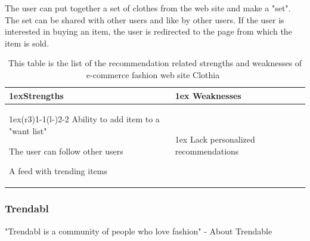     The user can put together a set of clothes from the web site and make a "set".
    The set can be shared with other users and like by other users.
    If the user is interested in buying an item, the user is redirected to the page from which the item is sold.
    \begin{table}[H]
                \centering
                \begin{tabularx}{\linewidth}{>{\parskip1ex}X@{\kern4\tabcolsep}>{\parskip1ex}X}
                \toprule
                \hfil\bfseries Strengths
                &
                \hfil\bfseries Weaknesses
                \\\cmidrule(r{3\tabcolsep}){1-1}\cmidrule(l{-\tabcolsep}){2-2}
                Ability to add item to a "want list" \par
                The user can follow other users \par
                A feed with trending items \par
            	&
                Lack personalized recommendations \par
                \\ \bottomrule
        \end{tabularx}
        \caption[Recommendation related strengths and weaknesses of Clothia~\cite{clothia}]{This table is the list of the recommendation related strengths and weaknesses of e-commerce fashion web site Clothia~\cite{clothia}}
        \label{table:ecommenreceClothia}
    \end{table}


\subsubsection{Trendabl} %
\label{par:trendabl}
    "Trendabl is a community of people who love fashion" - About Trendable~\cite{trendabl}


